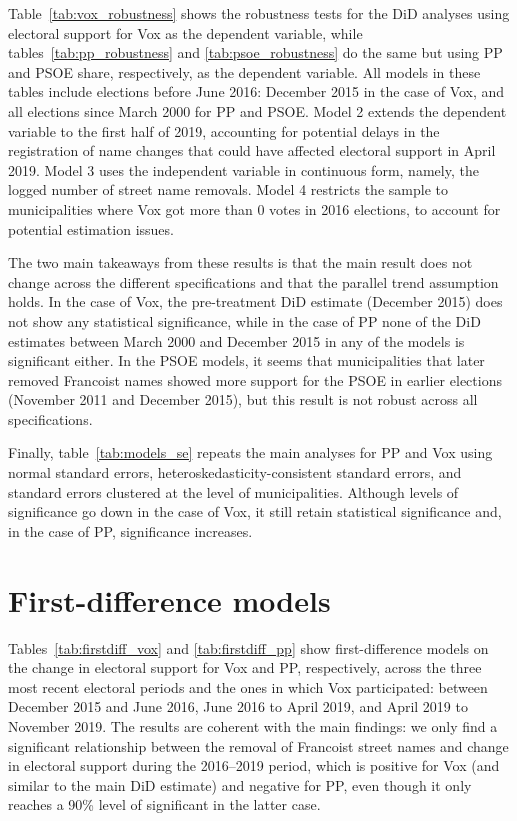 \documentclass[12pt, titlepage]{article}
\begin{document}
Table~\ref{tab:vox_robustness} shows the robustness tests for the DiD analyses using electoral support for Vox as the dependent variable, while tables~\ref{tab:pp_robustness} and \ref{tab:psoe_robustness} do the same but using PP and PSOE share, respectively, as the dependent variable.
All models in these tables include elections before June 2016: December 2015 in the case of Vox, and all elections since March 2000 for PP and PSOE.
Model 2 extends the dependent variable to the first half of 2019, accounting for potential delays in the registration of name changes that could have affected electoral support in April 2019.
Model 3 uses the independent variable in continuous form, namely, the logged number of street name removals.
Model 4 restricts the sample to municipalities where Vox got more than 0 votes in 2016 elections, to account for potential estimation issues.

The two main takeaways from these results is that the main result does not change across the different specifications and that the parallel trend assumption holds.
In the case of Vox, the pre-treatment DiD estimate (December 2015) does not show any statistical significance, while in the case of PP none of the DiD estimates between March 2000 and December 2015 in any of the models is significant either.
In the PSOE models, it seems that municipalities that later removed Francoist names showed more support for the PSOE in earlier elections (November 2011 and December 2015), but this result is not robust across all specifications.

Finally, table~\ref{tab:models_se} repeats the main analyses for PP and Vox using normal standard errors, heteroskedasticity-consistent standard errors, and standard errors clustered at the level of municipalities.
Although levels of significance go down in the case of Vox, it still retain statistical significance and, in the case of PP, significance increases.







\clearpage
\section{First-difference models}\label{app:first_diff}

Tables~\ref{tab:firstdiff_vox} and \ref{tab:firstdiff_pp} show first-difference models on the change in electoral support for Vox and PP, respectively, across the three most recent electoral periods and the ones in which Vox participated: between December 2015 and June 2016, June 2016 to April 2019, and April 2019 to November 2019.
The results are coherent with the main findings: we only find a significant relationship between the removal of Francoist street names and change in electoral support during the 2016--2019 period, which is positive for Vox (and similar to the main DiD estimate) and negative for PP, even though it only reaches a 90\% level of significant in the latter case.
\end{document}
